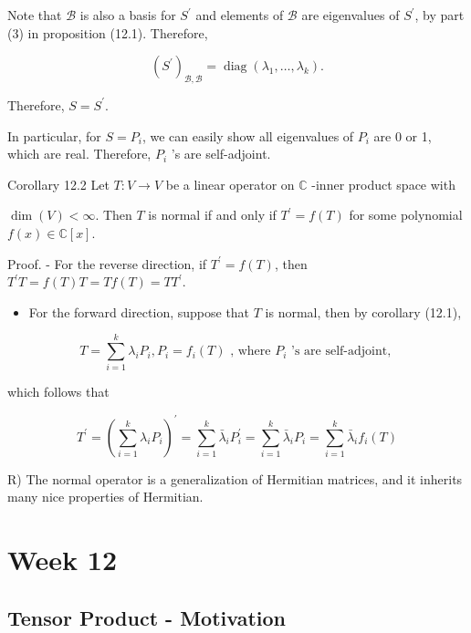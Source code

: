 \documentclass[11pt]{article}
\begin{document}
Note that \(\mathcal{B}\) is also a basis for \({S}^{\prime }\) and elements of \(\mathcal{B}\) are eigenvalues of \({S}^{\prime }\), by part (3) in proposition (12.1). Therefore,

\[
{\left( {S}^{\prime }\right) }_{\mathcal{B},\mathcal{B}} = \operatorname{diag}\left( {{\lambda }_1,\ldots ,{\lambda }_{k}}\right) .
\]

Therefore, \(S = {S}^{\prime }\).

In particular, for \(S = {P}_{i}\), we can easily show all eigenvalues of \({P}_{i}\) are 0 or 1, which are real. Therefore, \({P}_{i}\) ’s are self-adjoint.

Corollary 12.2 Let \(T : V \rightarrow  V\) be a linear operator on \(\mathbb{C}\) -inner product space with

\(\dim \left( V\right)  < \infty\). Then \(T\) is normal if and only if \({T}^{\prime } = f\left( T\right)\) for some polynomial \(f\left( x\right)  \in  \mathbb{C}\left\lbrack  x\right\rbrack\).

Proof. - For the reverse direction, if \({T}^{\prime } = f\left( T\right)\), then \({T}^{\prime }T = f\left( T\right) T = {Tf}\left( T\right)  = T{T}^{\prime }\).

\begin{itemize}
\item For the forward direction, suppose that \(T\) is normal, then by corollary (12.1),
\end{itemize}

\[
T = \mathop{\sum }\limits_{{i = 1}}^{k}{\lambda }_{i}{P}_{i},{P}_{i} = {f}_{i}\left( T\right) \text{ , where }{P}_{i}\text{ ’s are self-adjoint, }
\]

which follows that

\[
{T}^{\prime } = {\left( \mathop{\sum }\limits_{{i = 1}}^{k}{\lambda }_{i}{P}_{i}\right) }^{\prime } = \mathop{\sum }\limits_{{i = 1}}^{k}{\bar{\lambda }}_{i}{P}_{i}^{\prime } = \mathop{\sum }\limits_{{i = 1}}^{k}{\bar{\lambda }}_{i}{P}_{i} = \mathop{\sum }\limits_{{i = 1}}^{k}{\bar{\lambda }}_{i}{f}_{i}\left( T\right)
\]

R) The normal operator is a generalization of Hermitian matrices, and it inherits many nice properties of Hermitian.

\newpage
\section{Week 12}

\subsection{Tensor Product - Motivation}
\end{document}
